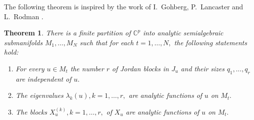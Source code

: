 \documentclass[10pt,reqno]{amsart}
\theoremstyle{break-italic}
\theoremstyle{break-italic}
\theoremstyle{break-italic}
\theoremstyle{break-italic}
\theoremstyle{break-italic}
\theoremstyle{break-italic}
\theoremstyle{break-italic}
\theoremstyle{break-italic}
\newtheorem{theorem}[satz]{Theorem}
\theoremstyle{break-roman}
\theoremstyle{standard}
\theoremstyle{varthm-roman}
\theoremstyle{varthm-italic}
\theoremstyle{varthm-roman-break}
\theoremstyle{varthm-italic-break}
\theoremstyle{varthm-roman-no-punctuation}
\theoremstyle{varthm-italic-no-punctuation}
\numberwithin{equation}{section}
\begin{document}
The following theorem is inspired by the work of  I.~Gohberg, P.~Lancaster and L.~Rodman \cite[Proposition~5.10 and Theorem~5.11]{Gohberg1982}.

\begin{theorem}\label{Theorem42}
There is a finite partition of $\mathbb{C}^p$ into analytic semialgebraic submanifolds $M_{1}, \ldots, M_N$ such that for each $t = 1, \ldots, N,$ the following statements hold:
\begin{enumerate}
\item[(i)] For every $u \in M_t$ the number $r$ of Jordan blocks in $J_u$ and their sizes $q_1, \ldots, q_r$ are independent of $u.$

\item[(ii)] The eigenvalues $\lambda_k(u), k = 1, \ldots, r,$ are analytic functions of $u$ on $M_{t}.$

\item[(iii)] The blocks $X_u^{(k)}, k = 1, \ldots, r,$ of $X_u$ are analytic functions of $u$ on $M_{t}.$
\end{enumerate}
\end{theorem}
\end{document}
